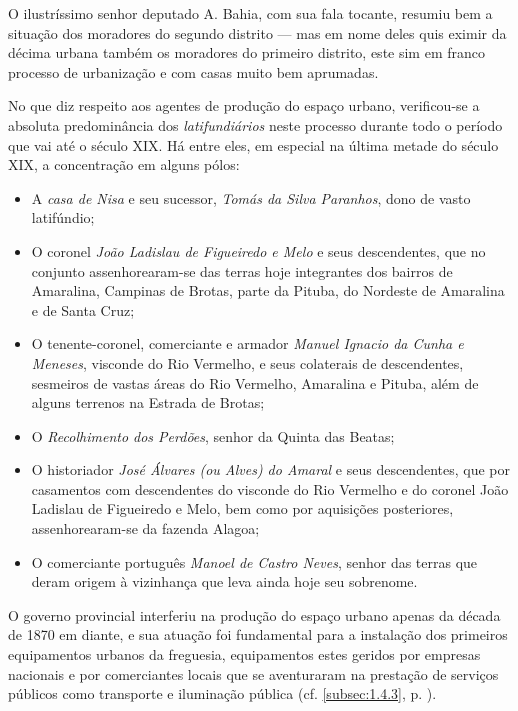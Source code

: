 O ilustríssimo senhor deputado A. Bahia, com sua fala tocante, resumiu bem a situação dos moradores do segundo distrito --- mas em nome deles quis eximir da décima urbana também os moradores do primeiro distrito, este sim em franco processo de urbanização e com casas muito bem aprumadas.

No que diz respeito aos agentes de produção do espaço urbano, verificou-se a absoluta predominância dos \textit{latifundiários} neste processo durante todo o período que vai até o século XIX. Há entre eles, em especial na última metade do século XIX, a concentração em alguns pólos: 

\begin{itemize}
\item A \textit{casa de Nisa} e seu sucessor, \textit{Tomás da Silva Paranhos}, dono de vasto latifúndio;
\item O coronel \textit{João Ladislau de Figueiredo e Melo} e seus descendentes, que no conjunto assenhorearam-se das terras hoje integrantes dos bairros de Amaralina, Campinas de Brotas, parte da Pituba, do Nordeste de Amaralina e de Santa Cruz; 
\item O tenente-coronel, comerciante e armador \textit{Manuel Ignacio da Cunha e Meneses}, visconde do Rio Vermelho, e seus colaterais de descendentes, sesmeiros de vastas áreas do Rio Vermelho, Amaralina e Pituba, além de alguns terrenos na Estrada de Brotas;
\item O \textit{Recolhimento dos Perdões}, senhor da Quinta das Beatas;
\item O historiador \textit{José Álvares (ou Alves) do Amaral} e seus descendentes, que por casamentos com descendentes do visconde do Rio Vermelho e do coronel João Ladislau de Figueiredo e Melo, bem como por aquisições posteriores, assenhorearam-se da fazenda Alagoa;
\item O comerciante português \textit{Manoel de Castro Neves}, senhor das terras que deram origem à vizinhança que leva ainda hoje seu sobrenome.
\end{itemize}

O governo provincial interferiu na produção do espaço urbano apenas da década de 1870 em diante, e sua atuação foi fundamental para a instalação dos primeiros equipamentos urbanos da freguesia, equipamentos estes geridos por empresas nacionais e por comerciantes locais que se aventuraram na prestação de serviços públicos como transporte e iluminação pública (cf. \autoref{subsec:1.4.3}, p. \pageref{subsec:1.4.3}).

